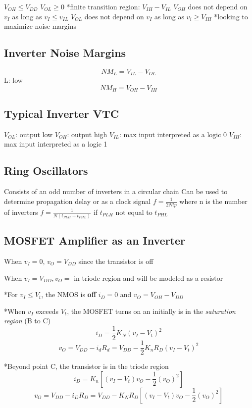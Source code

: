 \documentclass[12pt]{article}
\begin{document}
    $V_{OH} \leq V_{DD}$
    $V_{OL} \geq 0$
    *finite transition region: $V_{IH} - V_{IL}$
    $V_{OH}$ does not depend on $v_I$ as long as $v_I \leq v_{IL}$
    $V_{OL}$ does not depend on $v_I$ as long as $v_i \geq V_{IH}$
    *looking to maximize noise margins

    \subsection*{Inverter Noise Margins}

    $$NM_L = V_{IL} - V_{OL}$$
    L: low
    $$NM_H = V_{OH} - V_{IH}$$

    \subsection*{Typical Inverter VTC}

    $V_{OL}$: output low
    $V_{OH}$: output high
    $V_{IL}$: max input interpreted as a logic 0
    $V_{IH}$: max input interpreted as a logic 1

    \subsection*{Ring Oscillators}

    Consists of an odd number of inverters in a circular chain
    Can be used to determine propagation delay or as a clock signal
    $f = \frac{1}{2Ntp}$ where n is the number of inverters
    $f = \frac{1}{N(t_{PLH} + t_{PHL})}$ if $t_{PLH}$ not equal to $t_{PHL}$

    \subsection*{MOSFET Amplifier as an Inverter}

    When $v_I = 0$, $v_O = V_{DD}$ since the transistor is off

    When $v_I = V_{DD}, v_O =$
    in triode region and will be modeled as a resistor

    *For $v_I \leq V_t$, the NMOS is \textbf{off}
    $i_D = 0$ and $v_O = V_{OH} - V_{DD}$

    *When $v_I$ exceeds $V_t$, the MOSFET turns on an initially is in the \textit{saturation region} (B to C)
    $$i_D = \frac{1}{2}K_N(v_I - V_t)^2$$
    $$v_O = V_{DD} - i_dR_d = V_{DD} - \frac{1}{2}K_nR_D(v_I - V_t)^2$$

    *Beyond point C, the transistor is in the triode region
    $$i_D = K_n[(v_I - V_t)v_O - \frac{1}{2}(v_O)^2]$$
    $$v_O = V_{DD} - i_DR_D = V_{DD} - K_NR_D[(v_I - V_t)v_O - \frac{1}{2}(v_O)^2]$$
\end{document}
